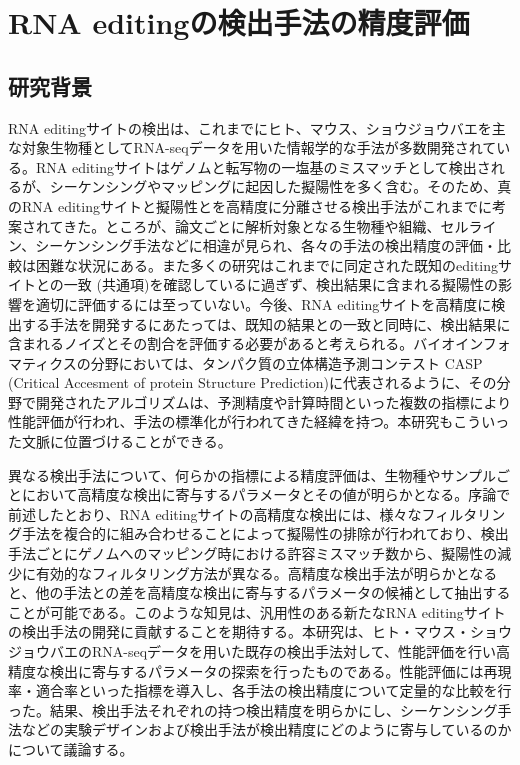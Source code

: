 \chapter{RNA editingの検出手法の精度評価}
\section{研究背景}
RNA editingサイトの検出は、これまでにヒト、マウス、ショウジョウバエを主な対象生物種としてRNA-seqデータを用いた情報学的な手法が多数開発されている。RNA editingサイトはゲノムと転写物の一塩基のミスマッチとして検出されるが、シーケンシングやマッピングに起因した擬陽性を多く含む。そのため、真のRNA editingサイトと擬陽性とを高精度に分離させる検出手法がこれまでに考案されてきた。ところが、論文ごとに解析対象となる生物種や組織、セルライン、シーケンシング手法などに相違が見られ、各々の手法の検出精度の評価・比較は困難な状況にある。また多くの研究はこれまでに同定された既知のeditingサイトとの一致 (共通項)を確認しているに過ぎず、検出結果に含まれる擬陽性の影響を適切に評価するには至っていない。今後、RNA editingサイトを高精度に検出する手法を開発するにあたっては、既知の結果との一致と同時に、検出結果に含まれるノイズとその割合を評価する必要があると考えられる。バイオインフォマティクスの分野においては、タンパク質の立体構造予測コンテスト CASP (Critical Accesment of protein Structure Prediction)に代表されるように、その分野で開発されたアルゴリズムは、予測精度や計算時間といった複数の指標により性能評価が行われ、手法の標準化が行われてきた経緯を持つ。本研究もこういった文脈に位置づけることができる。
\par
異なる検出手法について、何らかの指標による精度評価は、生物種やサンプルごとにおいて高精度な検出に寄与するパラメータとその値が明らかとなる。序論で前述したとおり、RNA editingサイトの高精度な検出には、様々なフィルタリング手法を複合的に組み合わせることによって擬陽性の排除が行われており、検出手法ごとにゲノムへのマッピング時における許容ミスマッチ数から、擬陽性の減少に有効的なフィルタリング方法が異なる。高精度な検出手法が明らかとなると、他の手法との差を高精度な検出に寄与するパラメータの候補として抽出することが可能である。このような知見は、汎用性のある新たなRNA editingサイトの検出手法の開発に貢献することを期待する。本研究は、ヒト・マウス・ショウジョウバエのRNA-seqデータを用いた既存の検出手法対して、性能評価を行い高精度な検出に寄与するパラメータの探索を行ったものである。性能評価には再現率・適合率といった指標を導入し、各手法の検出精度について定量的な比較を行った。結果、検出手法それぞれの持つ検出精度を明らかにし、シーケンシング手法などの実験デザインおよび検出手法が検出精度にどのように寄与しているのかについて議論する。
\newpage
